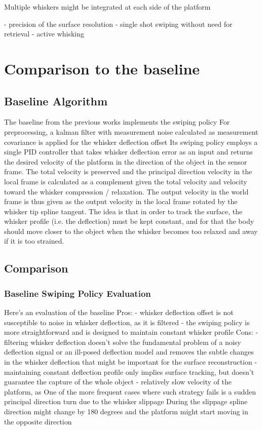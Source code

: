 Multiple whiskers might be integrated at each side of the platform

- precision of the surface resolution
- single shot swiping without need for retrieval
- active whisking

\section{Comparison to the baseline}
\subsection{Baseline Algorithm}
The baseline from the previous works implements the swiping policy
For preprocessing, a kalman filter with measurement noise calculated as measurement covariance is applied for the whisker deflection offset
Its swiping policy employs a single PID controller that takes whisker deflection error as an input and returns the desired velocity of the platform in the direction of the object in the sensor frame.
The total velocity is preserved and the principal direction velocity in the local frame is calculated as a complement given the total velocity and velocity toward the whisker compression / relaxation.
The output velocity in the world frame is thus given as the output velocity in the local frame rotated by the whisker tip spline tangent.
The idea is that in order to track the surface, the whisker profile (i.e. the deflection) must be kept constant, and for that the body should move closer to the object when the whisker becomes too relaxed and away if it is too strained.

\subsection{Comparison}

\subsubsection{Baseline Swiping Policy Evaluation}
Here's an evaluation of the baseline
Pros:
- whisker deflection offset is not susceptible to noise in whisker deflection, as it is filtered
- the swiping policy is more straightforward and is designed to maintain constant whisker profile
Cons:
- filtering whisker deflection doesn't solve the fundamental problem of a noisy deflection signal or an ill-posed deflection model and removes the subtle changes in the whisker deflection that might be important for the surface reconstruction
- maintaining constant deflection profile only implies surface tracking, but doesn't guarantee the capture of the whole object
- relatively slow velocity of the platform, as
One of the more frequent cases where such strategy fails is a sudden principal direction turn due to the whisker slippage
During the slippage spline direction might change by 180 degrees and the platform might start moving in the opposite direction

